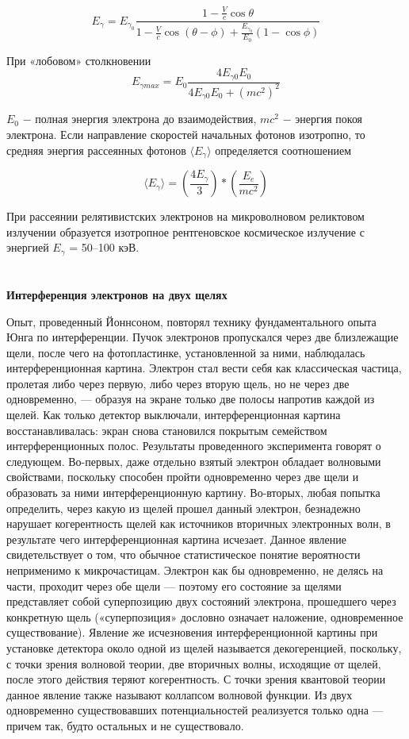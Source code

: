 	$$E_γ = E_{γ_0}\frac{1-\frac{V}{c}\cos\theta}{1-\frac{V}{c}\cos(\theta-\phi)+\frac{E_{γ_0}}{E_0}(1-\cos\phi)}$$
	
	При «лобовом» столкновении
	$$E_{γmax} = E_0 \frac{4E_{γ0} E_0}{4E_{γ0} E_0 + (mc^2)^2}$$
	
	
	$E_{0}$ − полная энергия электрона до взаимодействия, $ mc^2$ − энергия покоя электрона.
	Если направление скоростей начальных фотонов изотропно, то средняя энергия рассеянных фотонов  $\langle E_γ \rangle$  определяется соотношением
	
	$$\langle E_γ \rangle = (\frac{4E_γ}{3})*(\frac{E_e}{mc^2})$$
	
	При рассеянии релятивистских электронов на микроволновом реликтовом излучении образуется изотропное рентгеновское космическое излучение с энергией 
	$E_γ$ = 50–100 кэВ.
	\\\\\\
	\textbf{Интерференция электронов на двух щелях}
	
	Опыт, проведенный Йоннсоном, повторял технику фундаментального опыта Юнга по интерференции. Пучок электронов пропускался через две близлежащие щели, после чего на фотопластинке, установленной за ними, наблюдалась интерференционная картина.
	Электрон стал вести себя как классическая частица, пролетая либо через первую, либо через вторую щель, но не через две одновременно, — образуя на экране только две полосы напротив каждой из щелей. Как только детектор выключали, интерференционная картина восстанавливалась: экран снова становился покрытым семейством интерференционных полос.
	Результаты проведенного эксперимента говорят о следующем. Во-первых, даже отдельно взятый электрон обладает волновыми свойствами, поскольку способен пройти одновременно через две щели и образовать за ними интерференционную картину. Во-вторых, любая попытка определить, через какую из щелей прошел данный электрон, безнадежно нарушает когерентность щелей как источников вторичных электронных волн, в результате чего интерференционная картина исчезает.
	Данное явление свидетельствует о том, что обычное статистическое понятие вероятности неприменимо к микрочастицам. Электрон как бы одновременно, не делясь на части, проходит через обе щели — поэтому его состояние за щелями представляет собой суперпозицию двух состояний электрона, прошедшего через конкретную щель («суперпозиция» дословно означает наложение, одновременное существование). Явление же исчезновения интерференционной картины при установке детектора около одной из щелей называется декогеренцией, поскольку, с точки зрения волновой теории, две вторичных волны, исходящие от щелей, после этого действия теряют когерентность. С точки зрения квантовой теории данное явление также называют коллапсом волновой функции. Из двух одновременно существовавших потенциальностей реализуется только одна — причем так, будто остальных и не существовало.
	
	
